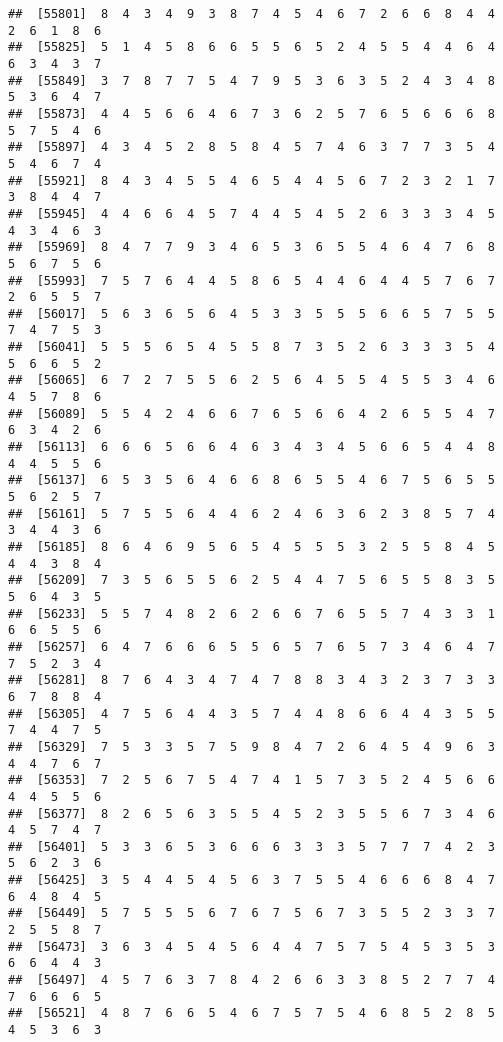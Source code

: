 \documentclass[
]{book}
\begin{document}
\begin{verbatim}
##  [55801]  8  4  3  4  9  3  8  7  4  5  4  6  7  2  6  6  8  4  4  2  6  1  8  6
##  [55825]  5  1  4  5  8  6  6  5  5  6  5  2  4  5  5  4  4  6  4  6  3  4  3  7
##  [55849]  3  7  8  7  7  5  4  7  9  5  3  6  3  5  2  4  3  4  8  5  3  6  4  7
##  [55873]  4  4  5  6  6  4  6  7  3  6  2  5  7  6  5  6  6  6  8  5  7  5  4  6
##  [55897]  4  3  4  5  2  8  5  8  4  5  7  4  6  3  7  7  3  5  4  5  4  6  7  4
##  [55921]  8  4  3  4  5  5  4  6  5  4  4  5  6  7  2  3  2  1  7  3  8  4  4  7
##  [55945]  4  4  6  6  4  5  7  4  4  5  4  5  2  6  3  3  3  4  5  4  3  4  6  3
##  [55969]  8  4  7  7  9  3  4  6  5  3  6  5  5  4  6  4  7  6  8  5  6  7  5  6
##  [55993]  7  5  7  6  4  4  5  8  6  5  4  4  6  4  4  5  7  6  7  2  6  5  5  7
##  [56017]  5  6  3  6  5  6  4  5  3  3  5  5  5  6  6  5  7  5  5  7  4  7  5  3
##  [56041]  5  5  5  6  5  4  5  5  8  7  3  5  2  6  3  3  3  5  4  5  6  6  5  2
##  [56065]  6  7  2  7  5  5  6  2  5  6  4  5  5  4  5  5  3  4  6  4  5  7  8  6
##  [56089]  5  5  4  2  4  6  6  7  6  5  6  6  4  2  6  5  5  4  7  6  3  4  2  6
##  [56113]  6  6  6  5  6  6  4  6  3  4  3  4  5  6  6  5  4  4  8  4  4  5  5  6
##  [56137]  6  5  3  5  6  4  6  6  8  6  5  5  4  6  7  5  6  5  5  5  6  2  5  7
##  [56161]  5  7  5  5  6  4  4  6  2  4  6  3  6  2  3  8  5  7  4  3  4  4  3  6
##  [56185]  8  6  4  6  9  5  6  5  4  5  5  5  3  2  5  5  8  4  5  4  4  3  8  4
##  [56209]  7  3  5  6  5  5  6  2  5  4  4  7  5  6  5  5  8  3  5  5  6  4  3  5
##  [56233]  5  5  7  4  8  2  6  2  6  6  7  6  5  5  7  4  3  3  1  6  6  5  5  6
##  [56257]  6  4  7  6  6  6  5  5  6  5  7  6  5  7  3  4  6  4  7  7  5  2  3  4
##  [56281]  8  7  6  4  3  4  7  4  7  8  8  3  4  3  2  3  7  3  3  6  7  8  8  4
##  [56305]  4  7  5  6  4  4  3  5  7  4  4  8  6  6  4  4  3  5  5  7  4  4  7  5
##  [56329]  7  5  3  3  5  7  5  9  8  4  7  2  6  4  5  4  9  6  3  4  4  7  6  7
##  [56353]  7  2  5  6  7  5  4  7  4  1  5  7  3  5  2  4  5  6  6  4  4  5  5  6
##  [56377]  8  2  6  5  6  3  5  5  4  5  2  3  5  5  6  7  3  4  6  4  5  7  4  7
##  [56401]  5  3  3  6  5  3  6  6  6  3  3  3  5  7  7  7  4  2  3  5  6  2  3  6
##  [56425]  3  5  4  4  5  4  5  6  3  7  5  5  4  6  6  6  8  4  7  6  4  8  4  5
##  [56449]  5  7  5  5  5  6  7  6  7  5  6  7  3  5  5  2  3  3  7  2  5  5  8  7
##  [56473]  3  6  3  4  5  4  5  6  4  4  7  5  7  5  4  5  3  5  3  6  6  4  4  3
##  [56497]  4  5  7  6  3  7  8  4  2  6  6  3  3  8  5  2  7  7  4  7  6  6  6  5
##  [56521]  4  8  7  6  6  5  4  6  7  5  7  5  4  6  8  5  2  8  5  4  5  3  6  3

\end{verbatim}
\end{document}
